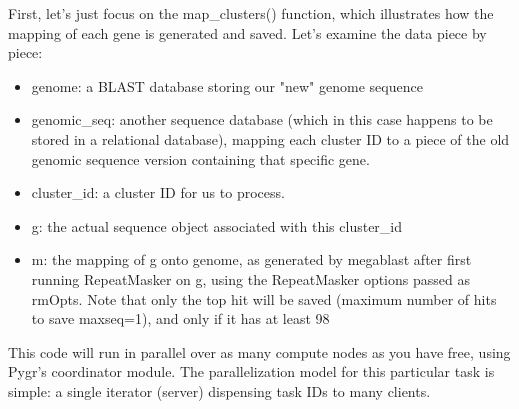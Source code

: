 \documentclass{howto}
\begin{document}
First, let's just focus on the map_clusters() function, which illustrates how the mapping of each gene is generated and saved.  Let's examine the data piece by piece:
\begin{itemize}

\item
genome: a BLAST database storing our "new" genome sequence

\item
genomic_seq: another sequence database (which in this case happens to be stored in a relational database), mapping each cluster ID to a piece of the old genomic sequence version containing that specific gene.

\item   
cluster_id: a cluster ID for us to process.

\item
g: the actual sequence object associated with this cluster_id

\item
m: the mapping of g onto genome, as generated by megablast after first running RepeatMasker on g, using the RepeatMasker options passed as rmOpts.  Note that only the top hit will be saved (maximum number of hits to save maxseq=1), and only if it has at least 98%

\end{itemize}
This code will run in parallel over as many compute nodes as you have free, using Pygr's coordinator module.  The parallelization model for this particular task is simple: a single iterator (server) dispensing task IDs to many clients. 
\end{document}
